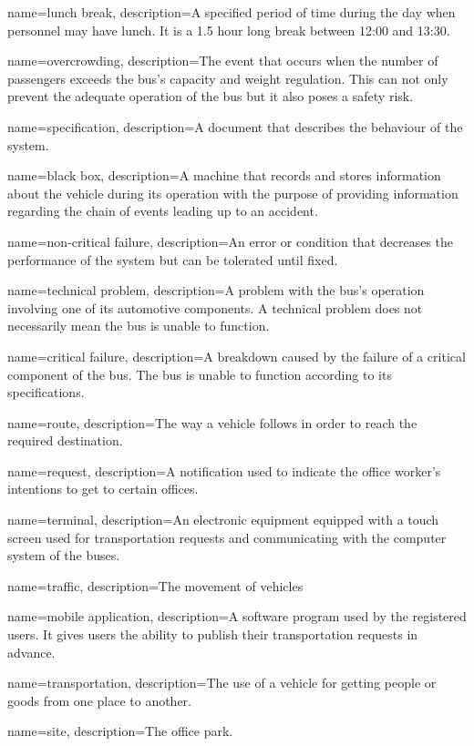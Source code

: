 {%
	name={lunch break},
	description={A specified period of time during the day when personnel
	may have lunch. It is a 1.5 hour long break between 12:00 and 13:30.}
}

{%
	name={overcrowding},
	description={The event that occurs when the number of passengers exceeds
	the bus's capacity and weight regulation. This can not only prevent the
	adequate operation of the bus but it also poses a safety risk.}
}

{%
	name={specification},
	description={A document that describes the behaviour of the system.}
}

{%
	name={black box},
	description={A machine that records and stores information about the
	vehicle during its operation with the purpose of providing information
	regarding the chain of events leading up to an accident.}
}

{%
	name={non-critical failure},
	description={An error or condition that decreases the performance of the
	system but can be tolerated until fixed.}
}

{%
	name={technical problem},
	description={A problem with the bus’s operation involving one of its
	automotive components. A technical problem does not necessarily mean the
	bus is unable to function.}
}

{%
	name={critical failure},
	description={A breakdown caused by the failure of a critical component
	of the bus. The bus is unable to function according to its
	specifications.}
}

{%
	name={route},
	description={The way a vehicle follows in order to reach the required
	destination.}
}

{%
	name={request},
	description={A notification used to indicate the office worker's
	intentions to get to certain offices.}
}

{%
	name={terminal},
	description={An electronic equipment equipped with a touch screen used
	for transportation requests and communicating with the computer system
	of the buses.}
}

{%
	name={traffic},
	description={The movement of vehicles}
}

{%
	name={mobile application},
	description={A software program used by the registered users. It gives
	users the ability to publish their transportation requests in advance.}
}

{%
	name={transportation},
	description={The use of a vehicle for getting people or goods from one
	place to another.}
}

{%
	name={site},
	description={The office park.}
}
